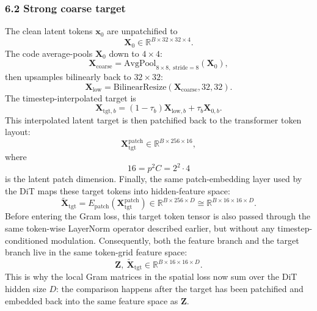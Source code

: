 \documentclass[11pt]{article}
\begin{document}
\subsubsection*{6.2 Strong coarse target}
The clean latent tokens $\bm{x}_0$ are unpatchified to
\[
  \bm{X}_0 \in \mathbb{R}^{B\times 32\times 32\times 4}.
\]
The code average-pools $\bm{X}_0$ down to $4\times 4$:
\[
  \bm{X}_{\mathrm{coarse}}
  =
  \mathrm{AvgPool}_{8\times 8,\; \mathrm{stride}=8}(\bm{X}_0),
\]
then upsamples bilinearly back to $32\times 32$:
\[
  \bm{X}_{\mathrm{low}}
  =
  \mathrm{BilinearResize}(\bm{X}_{\mathrm{coarse}}, 32, 32).
\]
The timestep-interpolated target is
\[
  \bm{X}_{\mathrm{tgt},b}
  =
  (1-\tau_b)\bm{X}_{\mathrm{low},b}
  +
  \tau_b \bm{X}_{0,b}.
\]
This interpolated latent target is then patchified back to the transformer token layout:
\[
  \bm{X}^{\mathrm{patch}}_{\mathrm{tgt}}
  \in
  \mathbb{R}^{B\times 256\times 16},
\]
where
\[
  16 = p^2 C = 2^2\cdot 4
\]
is the latent patch dimension. Finally, the same patch-embedding layer used by the DiT maps these target tokens into hidden-feature space:
\[
  \widetilde{\bm{X}}_{\mathrm{tgt}}
  =
  E_{\mathrm{patch}}\!\left(\bm{X}^{\mathrm{patch}}_{\mathrm{tgt}}\right)
  \in
  \mathbb{R}^{B\times 256\times D}
  \cong
  \mathbb{R}^{B\times 16\times 16\times D}.
\]
Before entering the Gram loss, this target token tensor is also passed through the same token-wise LayerNorm operator described earlier, but without any timestep-conditioned modulation.
Consequently, both the feature branch and the target branch live in the same token-grid feature space:
\[
  \bm{Z},\ \widetilde{\bm{X}}_{\mathrm{tgt}}
  \in
  \mathbb{R}^{B\times 16\times 16\times D}.
\]
This is why the local Gram matrices in the spatial loss now sum over the DiT hidden size $D$: the comparison happens after the target has been patchified and embedded back into the same feature space as $\bm{Z}$.
\end{document}
